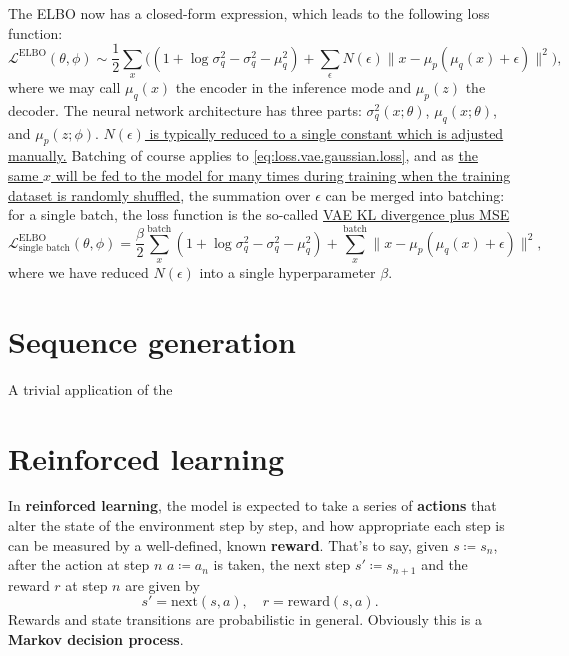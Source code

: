 \documentclass[hyperref, a4paper, 12pt]{report}
\newcommand*{\concept}[1]{{\textbf{#1}}}
\begin{document}
The ELBO now has a closed-form expression, which leads to the following loss function:
\begin{equation}
    \mathcal{L}^{\text{ELBO}}(\theta, \phi) \sim \frac{1}{2} \sum_x 
    \big(
        (1 + \log \sigma_q^2 - \sigma_q^2 - \mu_q^2) + \sum_\epsilon N(\epsilon) \| x - \mu_p(\mu_q(x) + \epsilon) \|^2
    \big),
    \label{eq:loss.vae.gaussian.loss}
\end{equation}
where we may call $\mu_q(x)$ the encoder in the inference mode and $\mu_p(z)$ the decoder.
The neural network architecture has three parts: $\sigma_q^2(x; \theta)$, $\mu_q(x; \theta)$,
and $\mu_p(z; \phi)$.
\uline{$N(\epsilon)$ is typically reduced to a single constant which is adjusted manually.}
Batching of course applies to \eqref{eq:loss.vae.gaussian.loss},
and as \uline{the same $x$ will be fed to the model for many times during training when the training dataset is randomly shuffled},
the summation over $\epsilon$ can be merged into batching:
for a single batch, the loss function is the so-called \uline{VAE KL divergence plus MSE} 
\begin{equation}
    \mathcal{L}^{\text{ELBO}}_{\text{single batch}}(\theta, \phi) 
    = \frac{\beta}{2} \sum_{x}^{\text{batch}} (1 + \log \sigma_q^2 - \sigma_q^2 - \mu_q^2) 
    + \sum_x^{\text{batch}} \| x - \mu_p(\mu_q(x) + \epsilon) \|^2,
\end{equation}
where we have reduced $N(\epsilon)$ into a single hyperparameter $\beta$. 

\section{Sequence generation}

A trivial application of the 

\section{Reinforced learning}

In \concept{reinforced learning}, the model is expected to take a series of \concept{actions} 
that alter the state of the environment step by step,
and how appropriate each step is can be measured by a well-defined, known \concept{reward}.
That's to say, given $s \coloneqq s_n$, 
after the action at step $n$ $a \coloneqq a_n$ is taken,
the next step $s' \coloneqq s_{n+1}$ and the reward $r$ at step $n$ are given by 
\begin{equation}
    s' = \mathrm{next}(s, a), \quad r = \mathrm{reward}(s, a).
\end{equation}
Rewards and state transitions are probabilistic in general.
Obviously this is a \concept{Markov decision process}.
\end{document}
